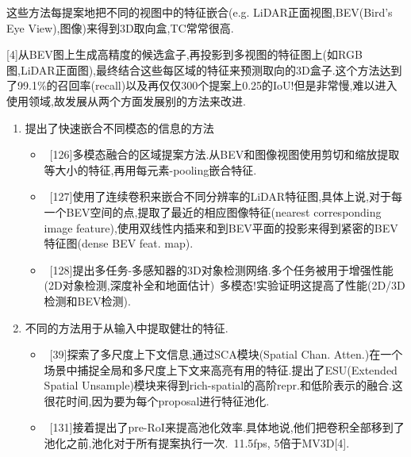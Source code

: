 \documentclass{article}
\begin{document}
  这些方法每提案地把不同的视图中的特征嵌合(e.g. LiDAR正面视图,BEV(Bird's Eye View),图像)来得到3D取向盒,TC常常很高.


[4]从BEV图上生成高精度的候选盒子,再投影到多视图的特征图上(如RGB图,LiDAR正面图),最终结合这些每区域的特征来预测取向的3D盒子.这个方法达到了99.1\%的召回率(recall)以及再仅仅300个提案上0.25的IoU!但是非常慢,难以进入使用领域,故发展从两个方面发展别的方法来改进.

\begin{enumerate}
    \item 提出了快速嵌合不同模态的信息的方法
    \begin{itemize}
        \item \ [126]多模态融合的区域提案方法.从BEV和图像视图使用剪切和缩放提取等大小的特征,再用每元素-pooling嵌合特征.
        \item \ [127]使用了连续卷积来嵌合不同分辨率的LiDAR特征图,具体上说,对于每一个BEV空间的点,提取了最近的相应图像特征(nearest corresponding image feature),使用双线性内插来和到BEV平面的投影来得到紧密的BEV特征图(dense BEV feat. map).
        \item \ [128]提出多任务-多感知器的3D对象检测网络.多个任务被用于增强性能(2D对象检测,深度补全和地面估计)~多模态!实验证明这提高了性能(2D/3D检测和BEV检测).
    \end{itemize}
    \item 不同的方法用于从输入中提取健壮的特征.
    \begin{itemize}
        \item \ [39]探索了多尺度上下文信息,通过SCA模块(Spatial Chan. Atten.)在一个场景中捕捉全局和多尺度上下文来高亮有用的特征.提出了ESU(Extended Spatial Unsample)模块来得到rich-spatial的高阶repr.和低阶表示的融合.这很花时间,因为要为每个proposal进行特征池化.
        \item \ [131]接着提出了pre-RoI来提高池化效率.具体地说,他们把卷积全部移到了池化之前,池化对于所有提案执行一次.~11.5fps, 5倍于MV3D[4].
    \end{itemize}
    
\end{enumerate}
\end{document}
